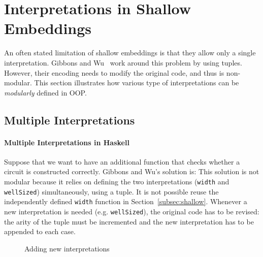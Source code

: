 \section{Interpretations in Shallow Embeddings}


An often stated limitation of shallow embeddings is that they allow only a single
interpretation. Gibbons and Wu~\cite{gibbons2014folding} work around this problem by using tuples. However, their encoding needs to modify
the original code, and thus is non-modular. This section illustrates how various type of
interpretations can be \emph{modularly} defined in OOP.
\begin{comment}
Although a modular solution based on \cite{swierstra2008data}
is also presented, it complicates the encoding dramatically and may prevent pratical use.
OO approach, on the contrary, provides modular yet simple solution of defining
multiple interpretations. 
\end{comment}


\subsection{Multiple Interpretations}\label{subsec:multiple}
\paragraph{Multiple Interpretations in Haskell}
Suppose that we want to have an additional function that checks whether a circuit is
constructed correctly. Gibbons and Wu's solution is:
\noindent This solution is not modular because it relies 
on defining the two interpretations (\lstinline{width} and
\lstinline{wellSized}) simultaneously, using a tuple. It is not
possible reuse the independently defined \lstinline{width} function in
Section~\ref{subsec:shallow}.
Whenever a new interpretation is needed (e.g. \lstinline{wellSized}), the
original code has to be revised:
the arity of the tuple must be incremented and the new interpretation has to be
appended to each case.

\begin{figure}
\caption{Adding new interpretations}
\label{code:operation}
\end{figure}

